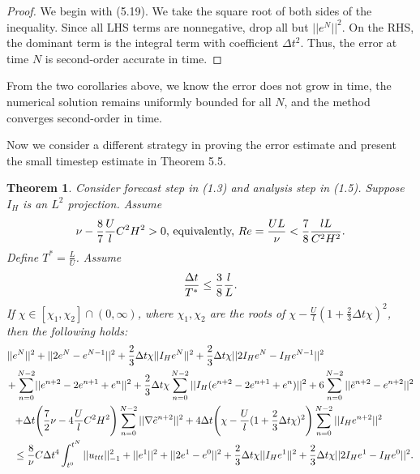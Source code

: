 \documentclass[10pt,a4paper]{amsart}
\newtheorem{theorem}{Theorem}[section]
\begin{document}
\begin{proof}
    We begin with (5.19). We take the square root of both sides of the inequality. Since all LHS terms are nonnegative, drop all but $||e^N||^2$. On the RHS, the dominant term is the integral term with coefficient $\Delta t^2$. Thus, the error at time $N$ is second-order accurate in time. 
\end{proof}
From the two corollaries above, we know the error does not grow in time, the numerical solution remains uniformly bounded for all $N$, and the method converges second-order in time.

Now we consider a different strategy in proving the error estimate and present the small timestep estimate in Theorem 5.5.


\begin{theorem}
    Consider forecast step in (1.3) and analysis step in (1.5). Suppose $I_H$ is an $L^2$ projection. Assume 
    \begin{align}
        \nu-\frac{8}{7}\frac{U}{l}C^2H^2>0 \text{, equivalently, } Re=\frac{UL}{\nu}<\frac{7}{8}\frac{lL}{C^2H^2}. \notag
    \end{align}
    Define $T^*=\frac{L}{U}$. Assume
    \begin{align}
    \frac{\Delta t}{T^*} \leq \frac{3}{8}\frac{l}{L}. \notag
    \end{align}
    If $\chi\in [\chi_1,\chi_2]\cap(0,\infty)$, where $\chi_1,\chi_2$ are the roots of $\chi-\frac{U}{l}(1+\frac{2}{3}\Delta t\chi)^2$, then the following holds:
    \begin{align}
        ||e^N||^2
        &+||2e^N-e^{N-1}||^2+\frac{2}{3}\Delta t\chi ||I_He^N||^2+\frac{2}{3}\Delta t\chi ||2I_He^N-I_He^{N-1}||^2  \notag \\
        +\sum_{n=0}^{N-2}&||e^{n+2}-2e^{n+1}+e^n||^2 + \frac{2}{3}\Delta t\chi \sum_{n=0}^{N-2} ||I_H(e^{n+2}-2e^{n+1}+e^n)||^2 + 6 \sum_{n=0}^{N-2} ||\tilde{e}^{n+2}-e^{n+2}||^2 \notag \\
        +\Delta t&\Bigg(\frac{7}{2}\nu -4\frac{U}{l}C^2H^2\Bigg) \sum_{n=0}^{N-2}||\nabla \tilde{e}^{n+2}||^2+4\Delta t\Bigg(\chi - \frac{U}{l}(1+\frac{2}{3}\Delta t\chi)^2\Bigg)\sum_{n=0}^{N-2} ||I_He^{n+2}||^2 \\
        \leq \frac{8}{\nu}&C\Delta t^4\int_{t^0}^{t^{N}}||u_{ttt}||_{-1}^2 + ||e^1||^2+||2e^1-e^0||^2+\frac{2}{3}\Delta t\chi ||I_He^1||^2+\frac{2}{3}\Delta t\chi ||2I_He^1-I_He^0||^2. \notag
    \end{align}
\end{theorem}
\end{document}
